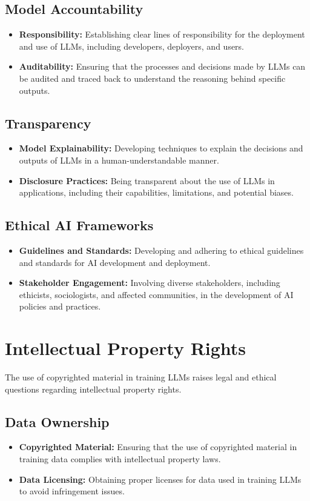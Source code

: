 \subsection{Model Accountability}
\begin{itemize}
    \item \textbf{Responsibility:} Establishing clear lines of responsibility for the deployment and use of LLMs, including developers, deployers, and users.
    \item \textbf{Auditability:} Ensuring that the processes and decisions made by LLMs can be audited and traced back to understand the reasoning behind specific outputs.
\end{itemize}

\subsection{Transparency}
\begin{itemize}
    \item \textbf{Model Explainability:} Developing techniques to explain the decisions and outputs of LLMs in a human-understandable manner.
    \item \textbf{Disclosure Practices:} Being transparent about the use of LLMs in applications, including their capabilities, limitations, and potential biases.
\end{itemize}

\subsection{Ethical AI Frameworks}
\begin{itemize}
    \item \textbf{Guidelines and Standards:} Developing and adhering to ethical guidelines and standards for AI development and deployment.
    \item \textbf{Stakeholder Engagement:} Involving diverse stakeholders, including ethicists, sociologists, and affected communities, in the development of AI policies and practices.
\end{itemize}

\section{Intellectual Property Rights}
The use of copyrighted material in training LLMs raises legal and ethical questions regarding intellectual property rights.

\subsection{Data Ownership}
\begin{itemize}
    \item \textbf{Copyrighted Material:} Ensuring that the use of copyrighted material in training data complies with intellectual property laws.
    \item \textbf{Data Licensing:} Obtaining proper licenses for data used in training LLMs to avoid infringement issues.
\end{itemize}

